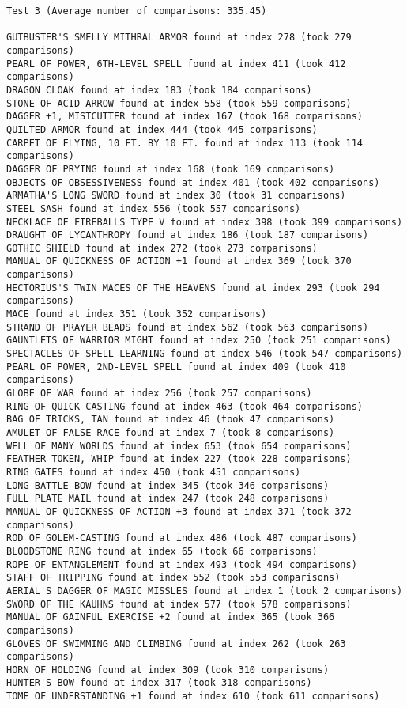 \documentclass{article}
\begin{document}
\pagebreak

\begin{verbatim}
Test 3 (Average number of comparisons: 335.45)

GUTBUSTER'S SMELLY MITHRAL ARMOR found at index 278 (took 279 comparisons)
PEARL OF POWER, 6TH-LEVEL SPELL found at index 411 (took 412 comparisons)
DRAGON CLOAK found at index 183 (took 184 comparisons)
STONE OF ACID ARROW found at index 558 (took 559 comparisons)
DAGGER +1, MISTCUTTER found at index 167 (took 168 comparisons)
QUILTED ARMOR found at index 444 (took 445 comparisons)
CARPET OF FLYING, 10 FT. BY 10 FT. found at index 113 (took 114 comparisons)
DAGGER OF PRYING found at index 168 (took 169 comparisons)
OBJECTS OF OBSESSIVENESS found at index 401 (took 402 comparisons)
ARMATHA'S LONG SWORD found at index 30 (took 31 comparisons)
STEEL SASH found at index 556 (took 557 comparisons)
NECKLACE OF FIREBALLS TYPE V found at index 398 (took 399 comparisons)
DRAUGHT OF LYCANTHROPY found at index 186 (took 187 comparisons)
GOTHIC SHIELD found at index 272 (took 273 comparisons)
MANUAL OF QUICKNESS OF ACTION +1 found at index 369 (took 370 comparisons)
HECTORIUS'S TWIN MACES OF THE HEAVENS found at index 293 (took 294 comparisons)
MACE found at index 351 (took 352 comparisons)
STRAND OF PRAYER BEADS found at index 562 (took 563 comparisons)
GAUNTLETS OF WARRIOR MIGHT found at index 250 (took 251 comparisons)
SPECTACLES OF SPELL LEARNING found at index 546 (took 547 comparisons)
PEARL OF POWER, 2ND-LEVEL SPELL found at index 409 (took 410 comparisons)
GLOBE OF WAR found at index 256 (took 257 comparisons)
RING OF QUICK CASTING found at index 463 (took 464 comparisons)
BAG OF TRICKS, TAN found at index 46 (took 47 comparisons)
AMULET OF FALSE RACE found at index 7 (took 8 comparisons)
WELL OF MANY WORLDS found at index 653 (took 654 comparisons)
FEATHER TOKEN, WHIP found at index 227 (took 228 comparisons)
RING GATES found at index 450 (took 451 comparisons)
LONG BATTLE BOW found at index 345 (took 346 comparisons)
FULL PLATE MAIL found at index 247 (took 248 comparisons)
MANUAL OF QUICKNESS OF ACTION +3 found at index 371 (took 372 comparisons)
ROD OF GOLEM-CASTING found at index 486 (took 487 comparisons)
BLOODSTONE RING found at index 65 (took 66 comparisons)
ROPE OF ENTANGLEMENT found at index 493 (took 494 comparisons)
STAFF OF TRIPPING found at index 552 (took 553 comparisons)
AERIAL'S DAGGER OF MAGIC MISSLES found at index 1 (took 2 comparisons)
SWORD OF THE KAUHNS found at index 577 (took 578 comparisons)
MANUAL OF GAINFUL EXERCISE +2 found at index 365 (took 366 comparisons)
GLOVES OF SWIMMING AND CLIMBING found at index 262 (took 263 comparisons)
HORN OF HOLDING found at index 309 (took 310 comparisons)
HUNTER'S BOW found at index 317 (took 318 comparisons)
TOME OF UNDERSTANDING +1 found at index 610 (took 611 comparisons)
\end{verbatim}
\end{document}
